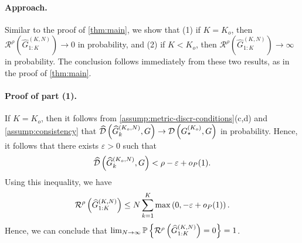 \paragraph{Approach.}
Similar to the proof of \cref{thm:main}, we show that 
(1) if $K=K_{o}$, then $\mathcal{R}^{\rho}(\widehat{G}^{(K,N)}_{1:K}) \to 0$ in probability, and 
(2) if $K<K_{o}$, then $\mathcal{R}^{\rho}(\widehat{G}^{(K,N)}_{1:K}) \to\infty$ in probability. 
The conclusion follows immediately from these two results, as 
in the proof of \cref{thm:main}. 

\paragraph{Proof of part (1).} 
If $K=K_{o}$, then it follows from \cref{assump:metric-discr-conditions}(c,d) and \cref{assump:consistency} that $\widehat{\mathcal{D}}\left(\widehat{G}^{(K_{o},N)}_{k},G\right)\to\mathcal{D}\left(G^{(K_{o})}_{\star}, G\right)$ in probability.
Hence, it follows that there exists $\varepsilon>0$ such that
\[
	\widehat{\mathcal{D}}\left(\widehat{G}^{(K_{o},N)}_{k},G\right)<\rho-\varepsilon+o_{P}(1).
\]
Using this inequality, we have
\[
	\mathcal{R}^{\rho}\left(\widehat{G}^{(K,N)}_{1:K}\right)
	\leq N\sum^{K}_{k=1}\mathop{\mathrm{max}}\left(0, -\varepsilon+o_{P}(1)\right).
\]
Hence, we can conclude that
$\lim_{N\to\infty}\mathbb{P}\left\{\mathcal{R}^{\rho}\left(\widehat{G}^{(K,N)}_{1:K}\right)=0\right\}=1$.


